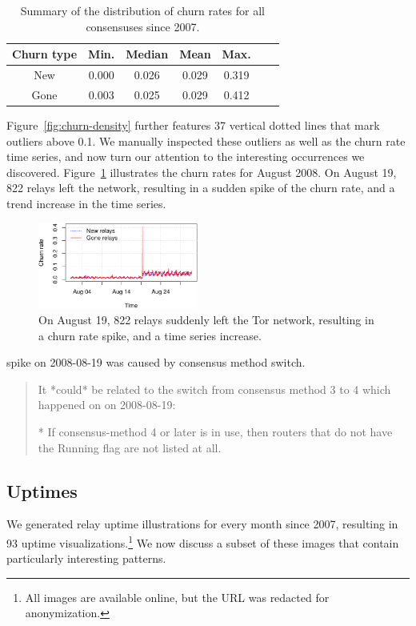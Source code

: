 \begin{table}[t]
	\centering
	\begin{tabular}{ccccccc}
	\textbf{Churn type} & \textbf{Min.} & \textbf{Median} & \textbf{Mean} & \textbf{Max.} \\
	\hline
	New & 0.000 & 0.026 & 0.029 & 0.319 \\
	Gone & 0.003 & 0.025 & 0.029 & 0.412 \\
	\end{tabular}
	\caption{Summary of the distribution of churn rates for all consensuses
	since 2007.}
	\label{tab:churn-dist}
\end{table}

Figure~\ref{fig:churn-density} further features 37 vertical dotted lines that
mark outliers above 0.1.  We manually inspected these outliers as well as the
churn rate time series, and now turn our attention to the interesting
occurrences we discovered.  Figure~\ref{fig:2008-08} illustrates the churn rates
for August 2008.  On August 19, 822 relays left the network, resulting in a
sudden spike of the churn rate, and a trend increase in the time series.

\begin{figure}[t]
	\centering
	\includegraphics[width=0.47\textwidth]{diagrams/2008-08.pdf}
	\caption{On August 19, 822 relays suddenly left the Tor network, resulting
	in a churn rate spike, and a time series increase.}
	\label{fig:2008-08}
\end{figure}

spike on 2008-08-19 was caused by consensus method switch.
\begin{quote}
It *could* be related to the switch from consensus method 3 to 4 which happened
on on 2008-08-19:

        * If consensus-method 4 or later is in use, then routers that
          do not have the Running flag are not listed at all.
\end{quote}

\subsection{Uptimes}
We generated relay uptime illustrations for every month since 2007, resulting in
93 uptime visualizations.\footnote{All images are available online, but the URL
was redacted for anonymization.}  We now discuss a subset of these images that
contain particularly interesting patterns.

